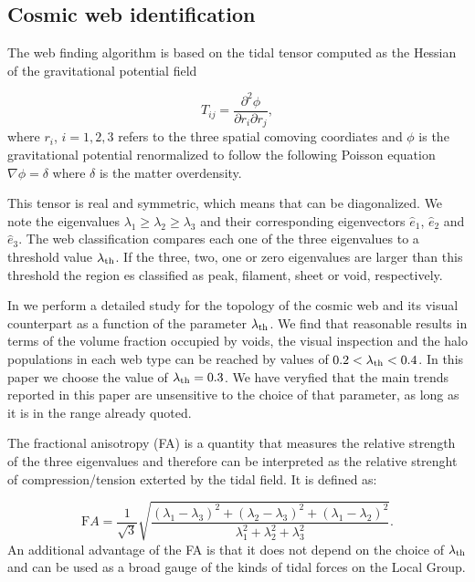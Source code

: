 \documentclass{emulateapj}
\begin{document}
\subsection{Cosmic web identification}
The web finding algorithm is based on the tidal tensor computed as the
Hessian of the  gravitational potential field

\begin{equation}
T_{ij} = \frac{\partial^2 \phi}{\partial r_i \partial r_j}, 
\end{equation}
where $r_{i}$, $i=1,2,3$ refers to the three spatial comoving
coordiates and $\phi$ is the gravitational potential renormalized to
follow the following Poisson equation $\nabla\phi=\delta$ where
$\delta$ is the matter overdensity.  

This tensor is real and symmetric, which means that can be
diagonalized. We note the eigenvalues $\lambda_1\geq \lambda_2\geq
\lambda_3$ and their corresponding eigenvectors $\hat{e}_1$,
$\hat{e}_2$ and $\hat{e}_3$. The web classification compares each one
of the three eigenvalues to a threshold value $\lambda_{\rm th}$. If the three, two, one or zero eigenvalues are larger than this threshold the region es classified as peak, filament, sheet or void, respectively. 

In \cite{Tweb} we perform a detailed study for the topology of the
cosmic web and its visual counterpart as a function of the parameter
$\lambda_{\rm th}$. We find that reasonable results in terms of the
volume fraction occupied by voids, the visual inspection and the halo
populations in each web type can be reached by values of $0.2<\lambda_{\rm
th}<0.4$. In this paper we choose the value of $\lambda_{\rm
  th}=0.3$. We have veryfied that the main trends reported in this
paper are unsensitive to the choice of that parameter, as long as it
is in the range already quoted.


The fractional anisotropy (FA) \citep{Libeskind2013} is a quantity
that measures the relative strength of the three eigenvalues and
therefore can be interpreted as the relative strenght of
compression/tension exterted by the tidal field. It is defined as:

\begin{equation}
{\mathrm FA}=\frac{1}{\sqrt{3}}\sqrt{\frac{(\lambda_1- \lambda_3)^2 + (\lambda_2 - \lambda_3)^2 + (\lambda_1 - \lambda_2)^2}{\lambda_1^2+\lambda_2^2 + \lambda_3^2}}.
\end{equation}
%
An additional advantage of the FA is that it does not depend on the
choice of $\lambda_{\rm th}$ and can be used as a broad gauge of the
kinds of tidal forces on the Local Group.
\end{document}
